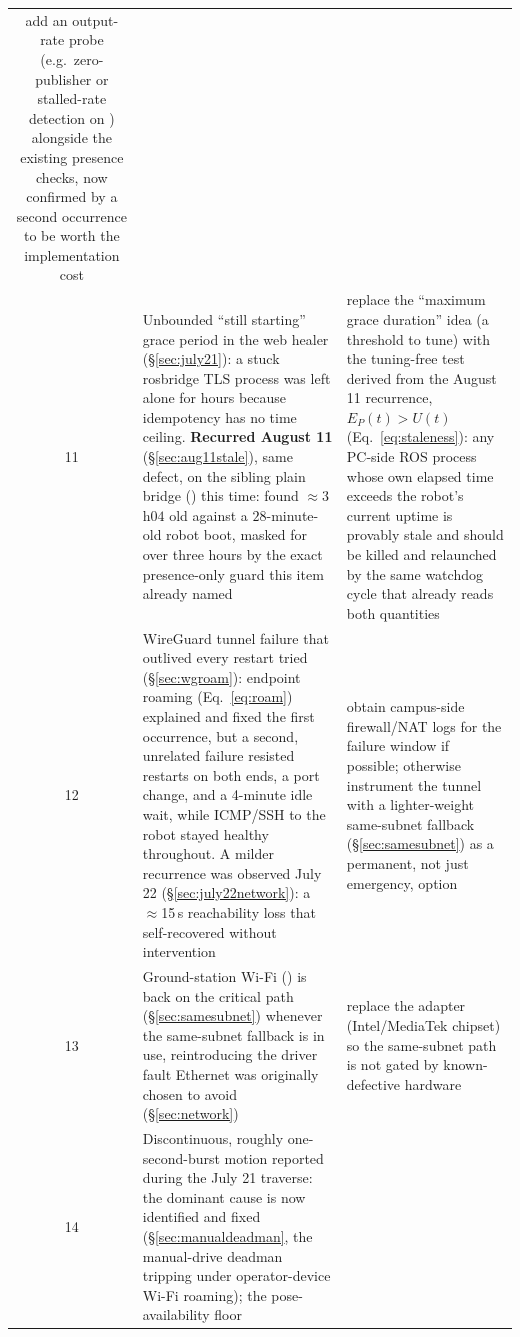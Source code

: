 \begin{longtable}{@{}cL{6.2cm}L{6.8cm}@{}}
    add an output-rate probe (e.g.\ zero-publisher or stalled-rate detection
    on ) alongside the existing presence checks,
    now confirmed by a second occurrence to be worth the implementation
    cost \\
11 & Unbounded ``still starting'' grace period in the web healer
    (\S\ref{sec:july21}): a stuck rosbridge TLS process was left alone for
    hours because idempotency has no time ceiling. \textbf{Recurred
    August 11} (\S\ref{sec:aug11stale}), same defect, on the sibling plain
    bridge () this time: found $\approx3$h$04$ old against a
    $28$-minute-old robot boot, masked for over three hours by the exact
    presence-only  guard this item already named &
    replace the ``maximum grace duration'' idea (a threshold to tune) with
    the tuning-free test derived from the August 11 recurrence,
    $E_P(t) > U(t)$ (Eq.~\ref{eq:staleness}): any PC-side ROS process whose
    own elapsed time exceeds the robot's current uptime is provably stale
    and should be killed and relaunched by the same watchdog cycle that
    already reads both quantities \\
12 & WireGuard tunnel failure that outlived every restart tried
    (\S\ref{sec:wgroam}): endpoint roaming (Eq.~\ref{eq:roam}) explained and
    fixed the first occurrence, but a second, unrelated failure resisted
    restarts on both ends, a port change, and a 4-minute idle wait, while
    ICMP/SSH to the robot stayed healthy throughout. A milder recurrence
    was observed July 22 (\S\ref{sec:july22network}): a $\approx$15\,s
    reachability loss that self-recovered without intervention &
    obtain campus-side firewall/NAT logs for the failure window if
    possible; otherwise instrument the tunnel with a lighter-weight
    same-subnet fallback (\S\ref{sec:samesubnet}) as a permanent, not just
    emergency, option \\
13 & Ground-station Wi-Fi () is back on the critical path
    (\S\ref{sec:samesubnet}) whenever the same-subnet fallback is in use,
    reintroducing the driver fault Ethernet was originally chosen to avoid
    (\S\ref{sec:network}) &
    replace the adapter (Intel/MediaTek chipset) so the same-subnet path is
    not gated by known-defective hardware \\
14 & Discontinuous, roughly one-second-burst motion reported during the
    July 21 traverse: the dominant cause is now identified and fixed
    (\S\ref{sec:manualdeadman}, the manual-drive deadman tripping under
    operator-device Wi-Fi roaming); the pose-availability floor

\end{longtable}
